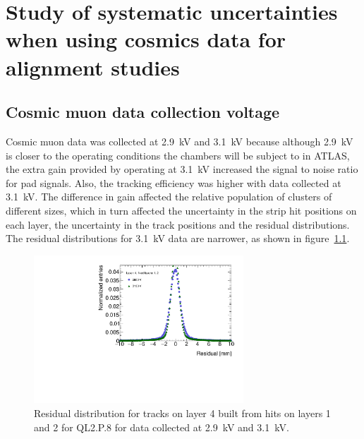 

\chapter[Analysis systematics]{Study of systematic uncertainties when using cosmics data for alignment studies}
\label{appendix:systematics}


\section{Cosmic muon data collection voltage}
\label{appendix:systematics_2900V_vs_3100V}


Cosmic muon data was collected at 2.9~kV and 3.1~kV because although 2.9~kV is closer to the operating conditions the chambers will be subject to in ATLAS, the extra gain provided by operating at 3.1~kV increased the signal to noise ratio for pad signals. Also, the tracking efficiency was higher with data collected at 3.1~kV. The difference in gain affected the relative population of clusters of different sizes, which in turn affected the uncertainty in the strip hit positions on each layer, the uncertainty in the track positions and the residual distributions. The residual distributions for 3.1~kV data are narrower, as shown in figure~\ref{fig:res_dist_2900V_3100V_412}.

\begin{figure}
    \centering
    \includegraphics[width = 0.7\textwidth]{figures/figure_residual_distributions_blue_QL2P08_2900V_2021-05-21_green_QL2P08_3100V_2021-05-21_layer4_fixedlayers12.pdf}
    \caption{Residual distribution for tracks on layer 4 built from hits on layers 1 and 2 for QL2.P.8 for data collected at 2.9~kV and 3.1~kV.}
    \label{fig:res_dist_2900V_3100V_412}
\end{figure}

